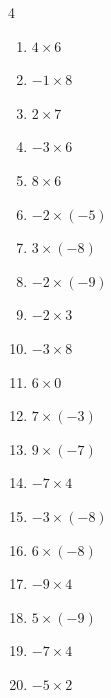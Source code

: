 \begin{multicols}{4}
\begin{enumerate}
  \item $4\times 6$
        \phantom{$=24$}

  \item $-1\times 8$
        \phantom{$=-8$}

  \item $2\times 7$
        \phantom{$=14$}

  \item $-3\times 6$
        \phantom{$=-18$}

  \item $8\times 6$
        \phantom{$=48$}

  \item $-2\times (-5)$
        \phantom{$=10$}

  \item $3\times (-8)$
        \phantom{$=-24$}

  \item $-2\times (-9)$
        \phantom{$=18$}

\columnbreak %

  \item $-2\times 3$
        \phantom{$=-6$}

  \item $-3\times 8$
        \phantom{$=-24$}

  \item $6\times 0$
        \phantom{$=0$}

  \item $7\times (-3)$
        \phantom{$=-21$}

  \item $9\times (-7)$
        \phantom{$=-63$}

  \item $-7\times 4$
        \phantom{$=-28$}

  \item $-3\times (-8)$
        \phantom{$=24$}

  \item $6\times (-8)$
        \phantom{$=-48$}

  \item $-9\times 4$
        \phantom{$=-36$}

  \item $5\times (-9)$
        \phantom{$=-45$}

  \item $-7\times 4$
        \phantom{$=-28$}

  \item $-5\times 2$
        \phantom{$=-10$}


\end{enumerate}
\end{multicols}
